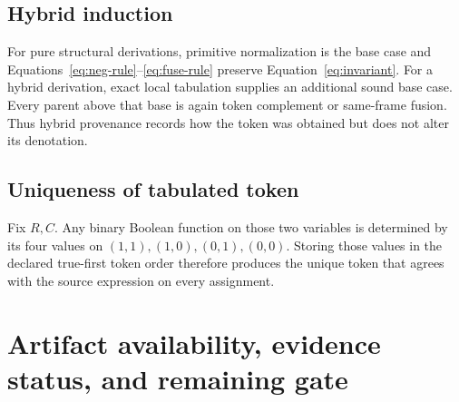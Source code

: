 \documentclass[10pt]{article}
\theoremstyle{plain}
\theoremstyle{definition}
\theoremstyle{remark}
\begin{document}
\subsection{Hybrid induction}

For pure structural derivations, primitive normalization is the base case and Equations~\eqref{eq:neg-rule}--\eqref{eq:fuse-rule} preserve Equation~\eqref{eq:invariant}. For a hybrid derivation, exact local tabulation supplies an additional sound base case. Every parent above that base is again token complement or same-frame fusion. Thus hybrid provenance records how the token was obtained but does not alter its denotation.

\subsection{Uniqueness of tabulated token}

Fix $R,C$. Any binary Boolean function on those two variables is determined by its four values on $(1,1),(1,0),(0,1),(0,0)$. Storing those values in the declared true-first token order therefore produces the unique token that agrees with the source expression on every assignment.

\section{Artifact availability, evidence status, and remaining gate}
\label{sec:availability}
\end{document}
